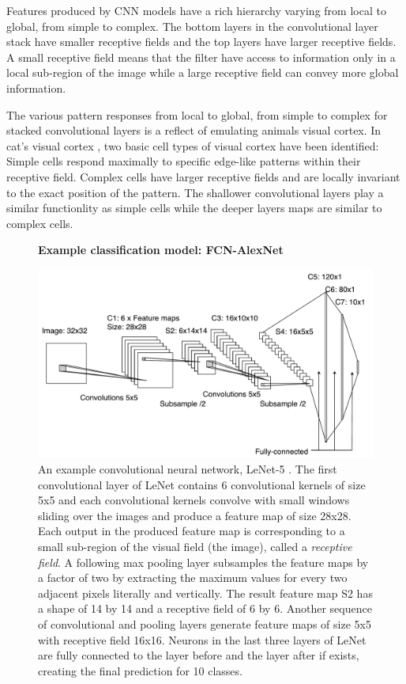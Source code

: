 

Features produced by CNN models have a rich hierarchy varying from local to global, from simple to complex.
The bottom layers in the convolutional layer stack have smaller receptive fields and the top layers have larger receptive fields.
A small receptive field means that the filter have access to information only in a local sub-region of the image while a large receptive field can convey more global information.

The various pattern responses from local to global, from simple to complex for stacked convolutional layers is a reflect of emulating animals visual cortex.
In cat's visual cortex \cite{hubel1962receptive}, two basic cell types of visual cortex have been identified:
Simple cells respond maximally to specific edge-like patterns within their receptive field.
Complex cells have larger receptive fields and are locally invariant to the exact position of the pattern.
The shallower convolutional layers play a similar functionlity as simple cells while the deeper layers maps are similar to complex cells.

\begin{figure}[t]
\centering
\textbf{Example classification model: FCN-AlexNet}\par\medskip
   \includegraphics[width=\linewidth]{img/lenet}
\caption{
An example convolutional neural network, LeNet-5 \cite{lecun1998gradient}.
The first convolutional layer of LeNet contains 6 convolutional kernels of size 5x5 and each convolutional kernels convolve with small windows sliding over the images and produce a feature map of size 28x28.
Each output in the produced feature map is corresponding to a small sub-region of the visual field (the image), called a \textit{receptive field}.
A following max pooling layer subsamples the feature maps by a factor of two by extracting the maximum values for every two adjacent pixels literally and vertically.
The result feature map S2 has a shape of 14 by 14 and a receptive field of 6 by 6.
Another sequence of convolutional and pooling layers generate feature maps of size 5x5 with receptive field 16x16.
Neurons in the last three layers of LeNet are fully connected to the layer before and the layer after if exists, creating the final prediction for 10 classes.
}
\label{fig:lenet}
\end{figure}

